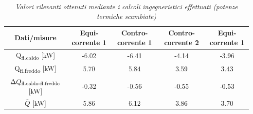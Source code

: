 \documentclass[a4paper,10pt]{article}                                                                                       %
\begin{document}
\vspace{3mm}                                                                                                                %
\begin{table}[H]                                                                                                            %
  \label{tab:heat_tr_calcs}                                                                                                 %
  \centering                                                                                                                %
  \begin{tabular}{||c|c|c|c|c||}                                                                                            %
    \hline
    Dati/misure                                         & Equi-corrente 1 & Contro-corrente 1 & Contro-corrente 2 & Equi-corrente 1 \\
    \hline\hline
    Q\textsubscript{fl.caldo} [kW]                      & -6.02           & -6.41             & -4.14             & -3.96           \\
    Q\textsubscript{fl.freddo} [kW]                     & 5.70            & 5.84              & 3.59              & 3.43            \\
    $\Delta{Q\textsubscript{fl.caldo-fl.freddo}}$ [kW]  & -0.32           & -0.56             & -0.55             & -0.53           \\
    $\bar{Q}$ [kW]                                      & 5.86            & 6.12              & 3.86              & 3.70            \\
    \hline
  \end{tabular}                                                                                                             %
  \caption{\textit{Valori rilevanti ottenuti mediante i calcoli ingegneristici effettuati (potenze termiche scambiate)}}    %
\end{table}                                                                                                                 %
\vspace{3mm}                                                                                                                %
\end{document}
